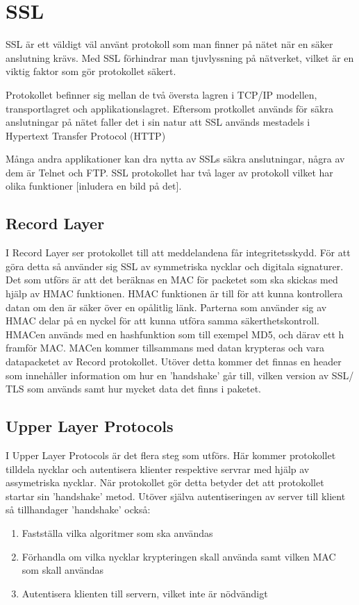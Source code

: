 \section{SSL}
SSL är ett väldigt väl använt protokoll som man finner på nätet när en säker anslutning krävs. Med SSL förhindrar man tjuvlyssning på nätverket, vilket är en viktig faktor som gör protokollet säkert. 

Protokollet befinner sig mellan de två översta lagren i TCP/IP modellen, transportlagret och applikationslagret.
Eftersom protkollet används för säkra anslutningar på nätet faller det i sin natur att SSL används mestadels i Hypertext Transfer Protocol (HTTP) \cite{JSSE} 

Många andra applikationer kan dra nytta av SSLs säkra anslutningar, några av dem är Telnet och FTP. 
SSL protokollet har två lager av protokoll vilket har olika funktioner [inludera en bild på det].

\subsection{Record Layer}
I Record Layer ser protokollet till att meddelandena får integritetsskydd. För att göra detta så använder sig SSL av symmetriska nycklar och digitala signaturer. Det som utförs är att det beräknas en MAC för packetet som ska skickas med hjälp av HMAC funktionen. HMAC funktionen är till för att kunna kontrollera datan om den är säker över en opålitlig länk. Parterna som använder sig av HMAC delar på en nyckel för att kunna utföra samma säkerthetskontroll. HMACen används med en hashfunktion som till exempel MD5, och därav ett h framför MAC. MACen kommer tillsammans med datan krypteras och vara datapacketet av Record protokollet. Utöver detta kommer det finnas en header som innehåller information om hur en 'handshake' går till, vilken version av SSL/ TLS som används samt hur mycket data det finns i paketet.

\subsection{Upper Layer Protocols}
I Upper Layer Protocols är det flera steg som utförs. Här kommer protokollet tilldela nycklar och autentisera klienter respektive servrar med hjälp av assymetriska nycklar. När protokollet gör detta betyder det att protokollet startar sin 'handshake' metod. Utöver själva autentiseringen av server till klient så tillhandager 'handshake' också:


\begin{enumerate}
\item{Fastställa vilka algoritmer som ska användas}
\item{Förhandla om vilka nycklar krypteringen skall använda samt vilken MAC som skall användas}
\item{Autentisera klienten till servern, vilket inte är nödvändigt}
\end{enumerate}

